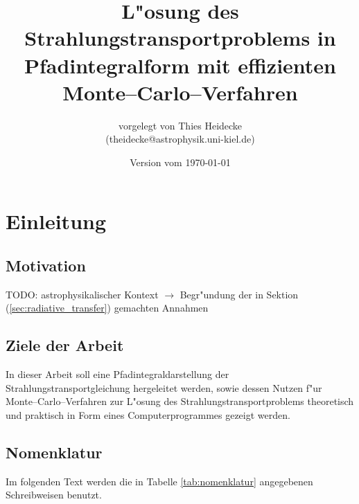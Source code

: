 \documentclass[11pt,a4paper,DIVcalc,BCOR8mm,titlepage,twoside]{scrartcl}
\begin{document}
	\titlehead{Christian--Albrechts--Universit"at zu Kiel\\ Institut f"ur Theoretische Physik und Astrophysik}
	\subject{Diplomarbeit}
	\title{L"osung des Strahlungstransportproblems in Pfadintegralform mit effizienten Monte--Carlo--Verfahren}
	\author{vorgelegt von Thies Heidecke\\(theidecke@astrophysik.uni-kiel.de)}
	\publishers{betreut durch Prof. Sebastian Wolf}
	\date{Version vom \today}
	\maketitle

	\tableofcontents
	\vfill
	\pagebreak
	
	\newcommand{\location}[1]{\mathbf{#1}}
	\newcommand{\scatter}[1]{\overset{#1}{\leftrightsquigarrow}}
	\newcommand{\normalized}[1]{\frac{#1}{||#1||}}
	
	\section{Einleitung}
	\subsection{Motivation}
	TODO: astrophysikalischer Kontext $\rightarrow$ Begr"undung der in Sektion (\ref{sec:radiative_transfer}) gemachten Annahmen
	\subsection{Ziele der Arbeit}
	In dieser Arbeit soll eine Pfadintegraldarstellung der Strahlungstransportgleichung hergeleitet werden, sowie dessen Nutzen f"ur Monte--Carlo--Verfahren zur L"osung des Strahlungstransportproblems theoretisch und praktisch in Form eines Computerprogrammes gezeigt werden.
	
	\subsection{Nomenklatur}
	Im folgenden Text werden die in Tabelle \ref{tab:nomenklatur} angegebenen Schreibweisen benutzt.
\end{document}
